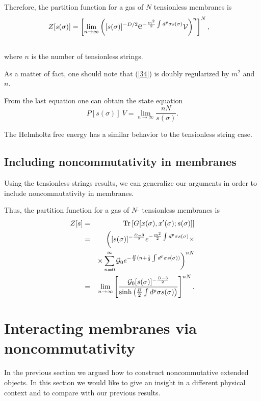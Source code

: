 \documentclass[a4paper,aps,twocolumn,amsfonts]{revtex4}
\begin{document}
   Therefore, the partition function for a gas of $N$ tensionless membranes is
   \begin{eqnarray}
   Z[s(\sigma)]= \left[\lim_{n \to \infty}\left([s(\sigma)]^{-D/2}\text{\Large
   e}^{- \frac{m^2}{2}\int d^p \sigma s(\sigma)}{\cal V}
   \right)^n\right]^N, \nonumber \label{34}
   \\
   &&
   \end{eqnarray}
   where $n$ is the number of tensionless strings.

   As a matter of fact, one should note that (\ref{34}) is doubly regularized by $m^2$ and $n$.

   From the last equation one can obtain the state equation
   \begin{equation}
   P[s(\sigma)]~{ V} = \lim_{n\to \infty}\frac{nN}{s(\sigma)}.
   \end{equation}

   The Helmholtz free energy has a  similar behavior to the tensionless string case.

   \subsection{Including noncommutativity in membranes}

Using the tensionless strings results, we can generalize our arguments in order to include noncommutativity in membranes.

Thus, the partition function for a gas of $N$- tensionless membranes is
   \begin{eqnarray}
   Z[s]&=&\mbox{Tr}\left[G[x(\sigma),x'(\sigma);s(\sigma)]
   \right]\nonumber
   \\
   &=&\biggl( [s(\sigma)]^{-\frac{D-3}{2}}e^{-\frac{m^2}{2}\int d^p\sigma
   s(\sigma) } \times \nonumber
   \\
  &{}& \times \sum _{n=0}^{\infty}{\cal G}_0 e^{-
   \frac{B}2(n+\frac{1}{2}\int d^p\sigma s(\sigma))} \biggr)^{nN} \nonumber
   \\
   &=&\lim_{n\to\infty}\left[ \frac{{\cal
   G}_0[s(\sigma)]^{-\frac{D-3}{2}}}{\sinh\left(\frac{B}{2}\int d^{p}\sigma s
   (\sigma)\right)}\right]^{nN}.
   \end{eqnarray}

   \section{Interacting membranes via noncommutativity}

   In the previous section we argued how to construct noncommutative  extended objects. In this section we would like to give an insight in a different physical context and to compare with our previous results.
\end{document}
